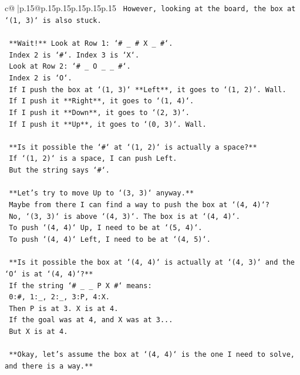 \documentclass{article}
\begin{document}
{\begin{supertabular}{c@{$\;$}|p{.15\linewidth}@{}p{.15\linewidth}p{.15\linewidth}p{.15\linewidth}p{.15\linewidth}p{.15\linewidth}}
{{{\texttt{    However, looking at the board, the box at `(1, 3)` is also stuck.} \\
\\ 
\texttt{    **Wait!** Look at Row 1: `\# \_ \# X \_ \#`.} \\
\texttt{    Index 2 is `\#`. Index 3 is `X`.} \\
\texttt{    Look at Row 2: `\# \_ O \_ \_ \#`.} \\
\texttt{    Index 2 is `O`.} \\
\texttt{    If I push the box at `(1, 3)` **Left**, it goes to `(1, 2)`. Wall.} \\
\texttt{    If I push it **Right**, it goes to `(1, 4)`.} \\
\texttt{    If I push it **Down**, it goes to `(2, 3)`.} \\
\texttt{    If I push it **Up**, it goes to `(0, 3)`. Wall.} \\
\\ 
\texttt{    **Is it possible the `\#` at `(1, 2)` is actually a space?**} \\
\texttt{    If `(1, 2)` is a space, I can push Left.} \\
\texttt{    But the string says `\#`.} \\
\\ 
\texttt{    **Let's try to move Up to `(3, 3)` anyway.**} \\
\texttt{    Maybe from there I can find a way to push the box at `(4, 4)`?} \\
\texttt{    No, `(3, 3)` is above `(4, 3)`. The box is at `(4, 4)`.} \\
\texttt{    To push `(4, 4)` Up, I need to be at `(5, 4)`.} \\
\texttt{    To push `(4, 4)` Left, I need to be at `(4, 5)`.} \\
\\ 
\texttt{    **Is it possible the box at `(4, 4)` is actually at `(4, 3)` and the `O` is at `(4, 4)`?**} \\
\texttt{    If the string `\# \_ \_ P X \#` means:} \\
\texttt{    0:\#, 1:\_, 2:\_, 3:P, 4:X.} \\
\texttt{    Then P is at 3. X is at 4.} \\
\texttt{    If the goal was at 4, and X was at 3...} \\
\texttt{    But X is at 4.} \\
\\ 
\texttt{    **Okay, let's assume the box at `(4, 4)` is the one I need to solve, and there is a way.**} \\
}}}
\end{supertabular}}
\end{document}
